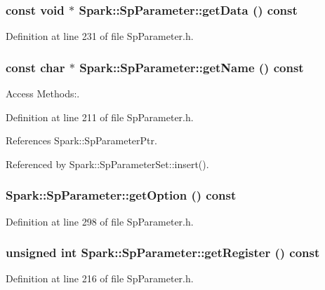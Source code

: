 \subsubsection{\setlength{\rightskip}{0pt plus 5cm}const void $\ast$ Spark::Sp\-Parameter::get\-Data () const\hspace{0.3cm}{\tt  [inline]}}\label{classSpark_1_1SpParameter_a23}


Definition at line 231 of file Sp\-Parameter.h.
\subsubsection{\setlength{\rightskip}{0pt plus 5cm}const char $\ast$ Spark::Sp\-Parameter::get\-Name () const\hspace{0.3cm}{\tt  [inline]}}\label{classSpark_1_1SpParameter_a14}


Access Methods:. 

Definition at line 211 of file Sp\-Parameter.h.

References Spark::Sp\-Parameter\-Ptr.

Referenced by Spark::Sp\-Parameter\-Set::insert().
\subsubsection{ Spark::Sp\-Parameter::get\-Option () const\hspace{0.3cm}{\tt  [inline]}}\label{classSpark_1_1SpParameter_a19}


Definition at line 298 of file Sp\-Parameter.h.
\subsubsection{\setlength{\rightskip}{0pt plus 5cm}unsigned int Spark::Sp\-Parameter::get\-Register () const\hspace{0.3cm}{\tt  [inline]}}\label{classSpark_1_1SpParameter_a21}


Definition at line 216 of file Sp\-Parameter.h.

